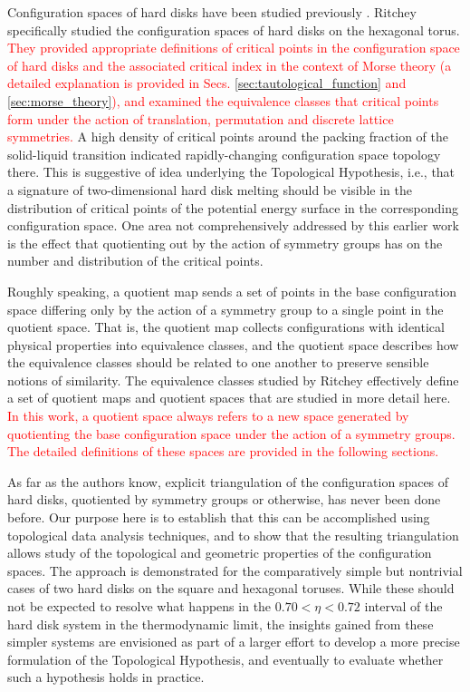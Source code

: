 \documentclass[default,iicol]{sn-jnl}%
\theoremstyle{thmstyleone}%
\theoremstyle{thmstyletwo}%
\theoremstyle{thmstylethree}%
\providecommand{\red}[1]{\textcolor{red}{#1}}
\begin{document}
Configuration spaces of hard disks have been studied previously \cite{carlsson2012harddisks,baryshnikov2014min}. Ritchey \cite{ritcheyphd} specifically studied the configuration spaces of hard disks on the hexagonal torus. \red{They provided appropriate definitions of critical points in the configuration space of hard disks and the associated critical index in the context of Morse theory (a detailed explanation is provided in Secs. \ref{sec:tautological_function} and \ref{sec:morse_theory}), and examined the equivalence classes that critical points form under the action of translation, permutation and discrete lattice symmetries.} A high density of critical points around the packing fraction of the solid-liquid transition indicated rapidly-changing configuration space topology there. This is suggestive of idea underlying the Topological Hypothesis, i.e., that a signature of two-dimensional hard disk melting should be visible in the distribution of critical points of the potential energy surface in the corresponding configuration space. One area not comprehensively addressed by this earlier work is the effect that quotienting out by the action of symmetry groups has on the number and distribution of the critical points.

Roughly speaking, a quotient map sends a set of points in the base configuration space differing only by the action of a symmetry group to a single point in the quotient space. That is, the quotient map collects configurations with identical physical properties into equivalence classes, and the quotient space describes how the equivalence classes should be related to one another to preserve sensible notions of similarity. The equivalence classes studied by Ritchey \cite{ritcheyphd} effectively define a set of quotient maps and quotient spaces that are studied in more detail here. \red{In this work, a quotient space always refers to a new space generated by quotienting the base configuration space under the action of a symmetry groups. The detailed definitions of these spaces are provided in the following sections.}

As far as the authors know, explicit triangulation of the configuration spaces of hard disks, quotiented by symmetry groups or otherwise, has never been done before. Our purpose here is to establish that this can be accomplished using topological data analysis techniques, and to show that the resulting triangulation allows study of the topological and geometric properties of the configuration spaces. The approach is demonstrated for the comparatively simple but nontrivial cases of two hard disks on the square and hexagonal toruses. While these should not be expected to resolve what happens in the $0.70 < \eta < 0.72$ interval of the hard disk system in the thermodynamic limit, the insights gained from these simpler systems are envisioned as part of a larger effort to develop a more precise formulation of the Topological Hypothesis, and eventually to evaluate whether such a hypothesis holds in practice.
\end{document}
